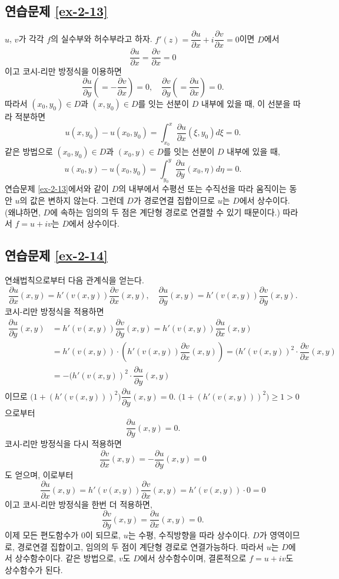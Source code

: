 \subsection*{연습문제 \ref{ex-2-13}}

$u$, $v$가 각각 $f$의 실수부와 허수부라고 하자.
$f'(z) = \dfrac{\partial u}{\partial x} + i \dfrac{\partial v}{\partial x} = 0$이면
$D$에서
\[
\dfrac{\partial u}{\partial x} = \dfrac{\partial v}{\partial x} = 0
\]
이고 코시-리만 방정식을 이용하면
\[
\dfrac{\partial u}{\partial y} \left( = - \dfrac{\partial v}{\partial x} \right) =0,\quad
\dfrac{\partial v}{\partial y} \left( = \dfrac{\partial u}{\partial x} \right) =0.
\]
따라서   $(x_0,y_0)\in D$과 $(x, y_0)\in D$를 잇는 선분이  $D$ 내부에 있을 때, 이 선분을 따라 적분하면
\[
u(x,y_0) - u(x_0,y_0) = \int_{x_0}^x \dfrac{\partial u}{\partial x}(\xi, y_0) d\xi = 0.
\]
같은 방법으로 
 $(x_0,y_0)\in D$과 $(x_0, y)\in D$를 잇는 선분이  $D$ 내부에 있을 때, 
\[
u(x_0,y) - u(x_0,y_0) = \int_{y_0}^y \dfrac{\partial u}{\partial y}(x_0, \eta) d\eta = 0.
\]
연습문제 \ref{ex-2-13}에서와 같이 
$D$의 내부에서 수평선 또는 수직선을 따라 움직이는 동안 $u$의 값은 변하지 않는다.
그런데 $D$가 경로연결 집합이므로 $u$는 $D$에서 상수이다.
(왜냐하면, $D$에 속하는 임의의  두 점은 계단형 경로로 연결할 수 있기 때문이다.)
따라서 $f=u+iv$는 $D$에서 상수이다.

\subsection*{연습문제 \ref{ex-2-14}}

연쇄법칙으로부터 다음 관계식을 얻는다.
\[
\dfrac{\partial u}{\partial x} (x,y) = h'(v(x,y))\dfrac{\partial v}{\partial x}  (x,y),
\quad
\dfrac{\partial u}{\partial y} (x,y) = h'(v(x,y))\dfrac{\partial v}{\partial y}  (x,y).
\]
코시-리만 방정식을 적용하면
\begin{align*}
\dfrac{\partial u}{\partial y} (x,y) 
&= h'(v(x,y))\dfrac{\partial v}{\partial y}  (x,y)
= h'(v(x,y))\dfrac{\partial u}{\partial x}  (x,y) \\
&= h'(v(x,y))\cdot\left( h'(v(x,y))\dfrac{\partial v}{\partial x}(x,y) \right) 
= (h'(v(x,y))^2\cdot \dfrac{\partial v}{\partial x}(x,y) \\
&= - (h'(v(x,y))^2\cdot \dfrac{\partial u}{\partial y}(x,y)
\end{align*}
이므로
$\Big(1+(h'(v(x,y)))^2\Big) \dfrac{\partial u}{\partial y}(x,y) = 0$.
$\Big(1+(h'(v(x,y)))^2\Big)\ge1 >0$으로부터
\[
\dfrac{\partial u}{\partial y}(x,y) = 0.
\]
코시-리만 방정식을 다시 적용하면
\[
\dfrac{\partial v}{\partial x}(x,y) = - \dfrac{\partial u}{\partial y}(x,y) = 0
\]
도 얻으며, 이로부터
\[
\dfrac{\partial u}{\partial x} (x,y) = h'(v(x,y))\dfrac{\partial v}{\partial x}  (x,y)
= h'(v(x,y))\cdot 0 = 0
\]
이고 코시-리만 방정식을 한번 더 적용하면,
\[
\dfrac{\partial v}{\partial y}(x,y) = \dfrac{\partial u}{\partial x}(x,y) = 0.
\]
이제 모든 편도함수가 $0$이 되므로,
$u$는 수평, 수직방향을 따라 상수이다.
$D$가 영역이므로, 경로연결 집합이고, 임의의 두 점이 계단형 경로로 연결가능하다.
따라서 $u$는 $D$에서 상수함수이다.
같은 방법으로, $v$도 $D$에서 상수함수이며,
결론적으로 $f=u+iv$도 상수함수가 된다.

